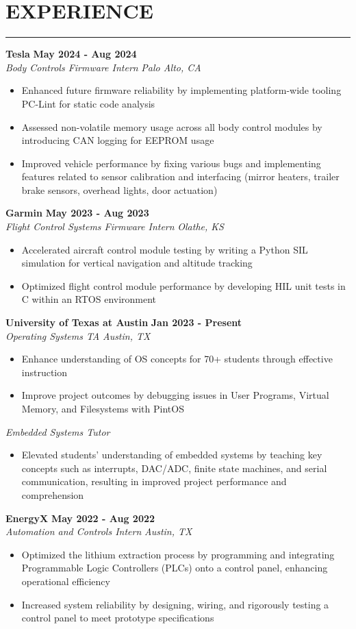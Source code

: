 \documentclass[10pt]{article}
\newcommand{\sectionHeader}[1]{%
    \vspace{-1.25\baselineskip}
    \section*{\large \MakeUppercase{#1}}
    \vspace{-1.5\baselineskip}
    \color{teal}
    \rule{\textwidth}{1.5pt} %
    \color{black}
    \vspace{-1.25\baselineskip}
    \pdfbookmark[1]{#1}{#1}
}
\newcommand{\role}[3]{
    \textit{#1} \hfill \textit{#2} \\[0pt]
    #3
}
\newcommand{\sectionItem}[5]{ %
    \textbf{#1} \hfill \textbf{#2} \\[0pt]
    \role{#3}{#4}{#5}    %
}
\begin{document}
\sectionHeader{Experience}
\begin{flushleft}
    \sectionItem{Tesla}{May 2024 - Aug 2024}{Body Controls Firmware Intern}{Palo Alto, CA}{
        \begin{itemize}
            \item Enhanced future firmware reliability by implementing platform-wide tooling PC-Lint for static code analysis
            \item Assessed non-volatile memory usage across all body control modules by introducing CAN logging for EEPROM usage
            \item Improved vehicle performance by fixing various bugs and implementing features related to sensor calibration and interfacing (mirror heaters, trailer brake sensors, overhead lights, door actuation)     
        \end{itemize}
    }
    
    \sectionItem{Garmin}{May 2023 - Aug 2023}{Flight Control Systems Firmware Intern}{Olathe, KS}{
        \begin{itemize}
            \item Accelerated aircraft control module testing by writing a Python SIL simulation for vertical navigation and altitude tracking
            \item Optimized flight control module performance by developing HIL unit tests in C within an RTOS environment
        \end{itemize}
    }

    \sectionItem{University of Texas at Austin}{Jan 2023 - Present}{Operating Systems TA}{Austin, TX}{
        \begin{itemize}
            \item Enhance understanding of OS concepts for 70+ students through effective instruction
            \item Improve project outcomes by debugging issues in User Programs, Virtual Memory, and Filesystems with PintOS
        \end{itemize}
        \role{Embedded Systems Tutor}{}{
            \begin{itemize}
                \item Elevated students' understanding of embedded systems by teaching key concepts such as interrupts, DAC/ADC, finite state machines, and serial communication, resulting in improved project performance and comprehension
            \end{itemize}
        }
    }

    \sectionItem{EnergyX}{May 2022 - Aug 2022}{Automation and Controls Intern}{Austin, TX}{
        \begin{itemize}
            \item Optimized the lithium extraction process by programming and integrating Programmable Logic Controllers (PLCs) onto a control panel, enhancing operational efficiency
            \item Increased system reliability by designing, wiring, and rigorously testing a control panel to meet prototype specifications
        \end{itemize}
    }
\end{flushleft}
\end{document}
